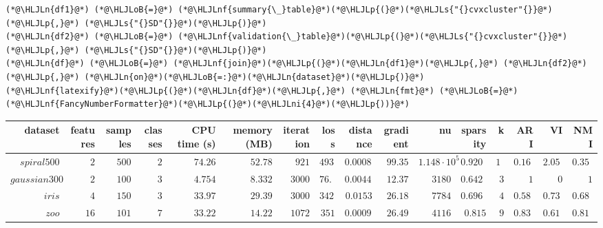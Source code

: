 \documentclass[12pt,a4paper]{article}
\newcommand{\HLJLn}[1]{#1}
\newcommand{\HLJLnf}[1]{\textcolor[RGB]{66,102,213}{#1}}
\newcommand{\HLJLs}[1]{\textcolor[RGB]{201,61,57}{#1}}
\newcommand{\HLJLni}[1]{\textcolor[RGB]{59,151,46}{#1}}
\newcommand{\HLJLoB}[1]{\textcolor[RGB]{102,102,102}{\textbf{#1}}}
\newcommand{\HLJLp}[1]{#1}
\begin{document}
\begin{lstlisting}
(*@\HLJLn{df1}@*) (*@\HLJLoB{=}@*) (*@\HLJLnf{summary{\_}table}@*)(*@\HLJLp{(}@*)(*@\HLJLs{"{}cvxcluster"{}}@*)(*@\HLJLp{,}@*) (*@\HLJLs{"{}SD"{}}@*)(*@\HLJLp{)}@*)
(*@\HLJLn{df2}@*) (*@\HLJLoB{=}@*) (*@\HLJLnf{validation{\_}table}@*)(*@\HLJLp{(}@*)(*@\HLJLs{"{}cvxcluster"{}}@*)(*@\HLJLp{,}@*) (*@\HLJLs{"{}SD"{}}@*)(*@\HLJLp{)}@*)
(*@\HLJLn{df}@*) (*@\HLJLoB{=}@*) (*@\HLJLnf{join}@*)(*@\HLJLp{(}@*)(*@\HLJLn{df1}@*)(*@\HLJLp{,}@*) (*@\HLJLn{df2}@*)(*@\HLJLp{,}@*) (*@\HLJLn{on}@*)(*@\HLJLoB{=:}@*)(*@\HLJLn{dataset}@*)(*@\HLJLp{)}@*)
(*@\HLJLnf{latexify}@*)(*@\HLJLp{(}@*)(*@\HLJLn{df}@*)(*@\HLJLp{,}@*) (*@\HLJLn{fmt}@*) (*@\HLJLoB{=}@*) (*@\HLJLnf{FancyNumberFormatter}@*)(*@\HLJLp{(}@*)(*@\HLJLni{4}@*)(*@\HLJLp{))}@*)
\end{lstlisting}


\begin{tabular}
{r | r | r | r | r | r | r | r | r | r | r | r | r | r | r | r}
dataset & features & samples & classes & CPU time (s) & memory (MB) & iteration & loss & distance & gradient & nu & sparsity & k & ARI & VI & NMI \\
\hline
$spiral500$ & $2$ & $500$ & $2$ & $74.26$ & $52.78$ & $921$ & $4937$ & $0.0008359$ & $99.35$ & $1.148 \cdot 10^{5}$ & $0.9206$ & $16$ & $0.1642$ & $2.056$ & $0.3511$ \\
$gaussian300$ & $2$ & $100$ & $3$ & $4.754$ & $8.332$ & $3000$ & $76.44$ & $0.004473$ & $12.37$ & $3180$ & $0.6424$ & $3$ & $1$ & $0$ & $1$ \\
$iris$ & $4$ & $150$ & $3$ & $33.97$ & $29.39$ & $3000$ & $342.7$ & $0.0153$ & $26.18$ & $7784$ & $0.6966$ & $4$ & $0.5895$ & $0.7395$ & $0.6849$ \\
$zoo$ & $16$ & $101$ & $7$ & $33.22$ & $14.22$ & $1072$ & $351$ & $0.0009914$ & $26.49$ & $4116$ & $0.815$ & $9$ & $0.8333$ & $0.6183$ & $0.8144$ \\
\end{tabular}
\end{document}
